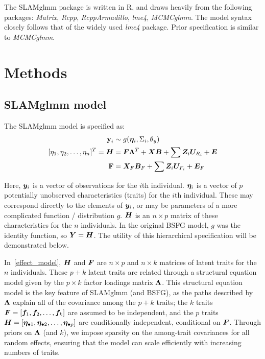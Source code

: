 \documentclass[11pt]{amsart}
\newcommand*{\B}[1]{\ifmmode\bm{#1}\else\textbf{#1}\fi}
\begin{document}
The SLAMglmm package is written in R, and draws heavily from the following packages: \emph{Matrix}, \emph{Rcpp}, \emph{RcppArmadillo}, \emph{lme4}, \emph{MCMCglmm}. The model syntax closely follows that of the widely used \emph{lme4} package. Prior specification is similar to \emph{MCMCglmm}.


\section{Methods}
\subsection{SLAMglmm model}
The SLAMglmm model is specified as:
\begin{align}
\label{effect_model}
\begin{split}
\B{y}_i &\sim g(\B{\eta}_i,\Sigma_{i},\theta_y) \\
[\eta_1, \eta_2, \dots, \eta_n]^T = \B{H} &=  \B{F}\B{\Lambda}^T + \B{X}\B{B} + \sum \B{Z}_i \B{U}_{R_i} + \B{E} \\
\B{F} &= \B{X}_F\B{B}_F + \sum \B{Z}_i \B{U}_{F_i} + \B{E}_F 
\end{split}
\end{align}

Here, $\B{y}_i$ is a vector of observations for the $i$th individual. 
$\B{\eta}_i$ is a vector of $p$ potentially unobserved characteristics (traits) for the $i$th individual. These may correspond directly to the elements of $\B{y}_i$, or may be parameters of a more complicated function / distribution $g$. $\B{H}$ is an $n \times p$ matrix of these characteristics for the $n$ individuals. In the original BSFG model, $g$ was the identity function, so $\B{Y} = \B{H}$. The utility of this hierarchical specification will be demonstrated below.

In~\ref{effect_model}, $\B{H}$ and $\B{F}$ are $n \times p$ and $n \times k$ matrices of latent traits for the $n$ individuals. These $p+k$ latent traits are related through a structural equation model given by the $p \times k$ factor loadings matrix $\B{\Lambda}$.  This structural equation model is the key feature of SLAMglmm (and BSFG), as the paths described by $\B{\Lambda}$ explain all of the covariance among the $p + k$ traits; the $k$ traits $\B{F} = [\B{f}_1, \B{f}_2,\dots, \B{f}_k]$ are assumed to be independent, and the $p$ traits $\B{H} = [\B{\eta}_{\bullet 1}, \B{\eta}_{\bullet 2},\dots,\B{\eta}_{\bullet p}]$ are conditionally independent, conditional on $\B{F}$. Through priors on $\B{\Lambda}$ (and $k$), we impose sparsity on the among-trait covariances for all random effects, ensuring that the model can scale efficiently with increasing numbers of traits.
\end{document}
